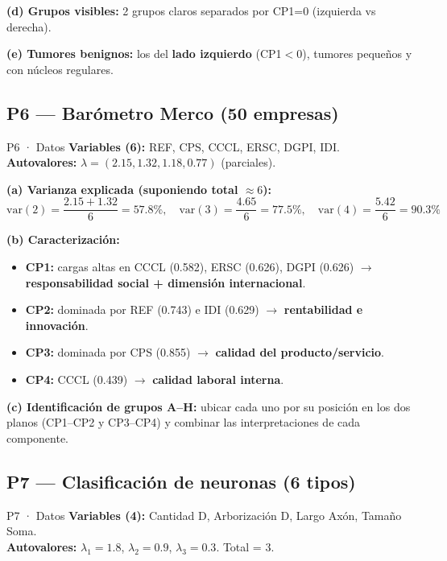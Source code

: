 \documentclass[11pt,a4paper]{article}
\begin{document}
\textbf{(d) Grupos visibles:} 2 grupos claros separados por CP1=0 (izquierda vs derecha).

\textbf{(e) Tumores benignos:} los del \textbf{lado izquierdo} (CP1$<$0), tumores pequeños y con núcleos regulares.

\hrulefill

\subsection{P6 — Barómetro Merco (50 empresas)}

\begin{ejerciciobox}{P6 · Datos}
\textbf{Variables (6):} REF, CPS, CCCL, ERSC, DGPI, IDI.\\
\textbf{Autovalores:} $\lambda = (2.15, 1.32, 1.18, 0.77)$ (parciales).
\end{ejerciciobox}

\textbf{(a) Varianza explicada (suponiendo total $\approx 6$):}
\[
\mathrm{var}(2) = \frac{2.15+1.32}{6} = 57.8\%, \quad
\mathrm{var}(3) = \frac{4.65}{6} = 77.5\%, \quad
\mathrm{var}(4) = \frac{5.42}{6} = 90.3\%
\]

\textbf{(b) Caracterización:}
\begin{itemize}[leftmargin=*]
    \item \textbf{CP1:} cargas altas en CCCL (0.582), ERSC (0.626), DGPI (0.626) $\to$ \textbf{responsabilidad social + dimensión internacional}.
    \item \textbf{CP2:} dominada por REF (0.743) e IDI (0.629) $\to$ \textbf{rentabilidad e innovación}.
    \item \textbf{CP3:} dominada por CPS (0.855) $\to$ \textbf{calidad del producto/servicio}.
    \item \textbf{CP4:} CCCL (0.439) $\to$ \textbf{calidad laboral interna}.
\end{itemize}

\textbf{(c) Identificación de grupos A--H:} ubicar cada uno por su posición en los dos planos (CP1--CP2 y CP3--CP4) y combinar las interpretaciones de cada componente.

\hrulefill

\subsection{P7 — Clasificación de neuronas (6 tipos)}

\begin{ejerciciobox}{P7 · Datos}
\textbf{Variables (4):} Cantidad D, Arborización D, Largo Axón, Tamaño Soma.\\
\textbf{Autovalores:} $\lambda_1=1.8$, $\lambda_2=0.9$, $\lambda_3=0.3$. Total = 3.
\end{ejerciciobox}
\end{document}
